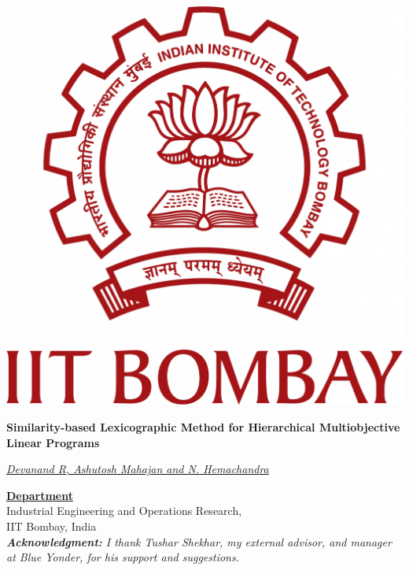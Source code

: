 \documentclass{article}
\title{}
\author{}
\date{}
\begin{document}
\pagecolor{salmon}
\begin{center}
  \begin{minipage}{.19\linewidth}
    \includegraphics[width=.5\linewidth]{iitb1.png}
  \end{minipage}
  \begin{minipage}{.6\linewidth}
    \begin{center}
      \Huge \textbf{Similarity-based Lexicographic Method for Hierarchical Multiobjective Linear Programs}
    \end{center}
    \begin{center}
      \huge \underline{{\it Devanand R, Ashutosh Mahajan and N. Hemachandra}}
    \end{center}
    
  \end{minipage}
  \hspace{.03\linewidth}
  \begin{minipage}{0.16\linewidth}
    \begin{flushright}
      \large \underline{\textbf{Department}}\\
      Industrial Engineering and Operations Research, \\
      IIT Bombay, India\\
      \vspace{.1cm} \small \emph{\textbf{Acknowledgment:} I thank Tushar Shekhar, my external advisor, and manager at Blue Yonder, for his support and suggestions.}
    \end{flushright}
  \end{minipage}
\end{center}
\vspace{.1cm}
\end{document}

